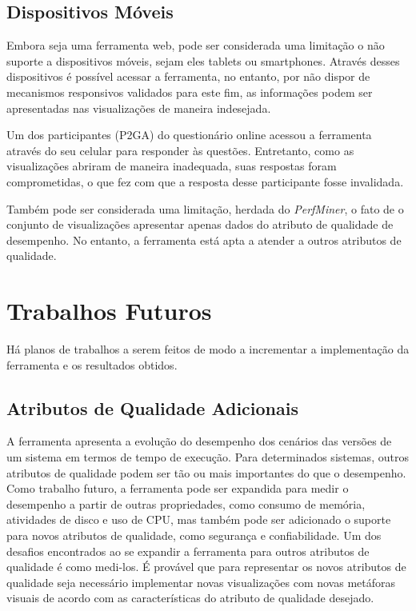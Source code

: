 \subsection{Dispositivos Móveis}

Embora seja uma ferramenta web, pode ser considerada uma limitação o não suporte a dispositivos móveis, sejam eles tablets ou smartphones. Através desses dispositivos é possível acessar a ferramenta, no entanto, por não dispor de mecanismos responsivos validados para este fim, as informações podem ser apresentadas nas visualizações de maneira indesejada.

Um dos participantes (P2GA) do questionário online acessou a ferramenta através do seu celular para responder às questões. Entretanto, como as visualizações abriram de maneira inadequada, suas respostas foram comprometidas, o que fez com que a resposta desse participante fosse invalidada.

Também pode ser considerada uma limitação, herdada do \textit{PerfMiner}, o fato de o conjunto de visualizações apresentar apenas dados do atributo de qualidade de  desempenho. No entanto, a ferramenta está apta a atender a outros atributos de qualidade.

\section{Trabalhos Futuros} \label{sec:consideracoes-trabalhos-futuros}

Há planos de trabalhos a serem feitos de modo a incrementar a implementação da ferramenta e os resultados obtidos.

\subsection{Atributos de Qualidade Adicionais}

A ferramenta apresenta a evolução do desempenho dos cenários das versões de um sistema em termos de tempo de execução. Para determinados sistemas, outros atributos de qualidade podem ser tão ou mais importantes do que o desempenho. Como trabalho futuro, a ferramenta pode ser expandida para medir o desempenho a partir de outras propriedades, como consumo de memória, atividades de disco e uso de CPU, mas também pode ser adicionado o suporte para novos atributos de qualidade, como segurança e confiabilidade. Um dos desafios encontrados ao se expandir a ferramenta para outros atributos de qualidade é como medi-los. É provável que para representar os novos atributos de qualidade seja necessário implementar novas visualizações com novas metáforas visuais de acordo com as características do atributo de qualidade desejado.

